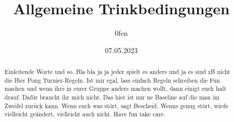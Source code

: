 \documentclass{article}
\title{Allgemeine Trinkbedingungen}
\author{0fen}
\date{07.05.2023}
\begin{document}
\maketitle
\begin{abstract}
    Einleitende Worte und so. Bla bla ja ja jeder spielt es anders und ja es sind zB nicht die Bier Pong Turnier-Regeln. Ist mir egal, lass einfach Regeln schreiben die Fun machen und wenn ihrs in eurer Gruppe anders machen wollt, dann einigt euch halt drauf. Dafür braucht ihr mich nicht. Das hier ist nur ne Baseline auf die man im Zweifel zurück kann. Wenn euch was stört, sagt Bescheid. Wenns genug stört, wirds vielleicht geändert, vielleicht auch nicht. Have fun take care.
\end{abstract}











\end{document}
